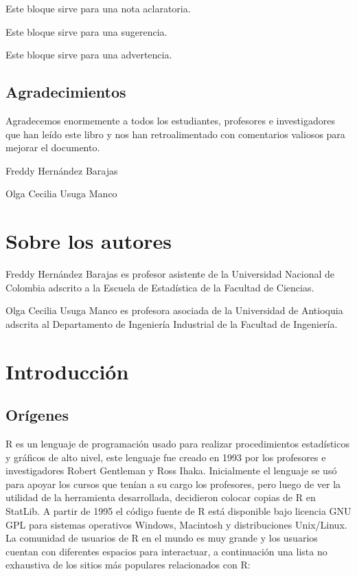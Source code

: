 \documentclass[10pt,]{krantz}
\let\proglang=\textsf
\let\BeginKnitrBlock\begin \let\EndKnitrBlock\end
\begin{document}
\BeginKnitrBlock{rmdnote}
Este bloque sirve para una nota aclaratoria.
\EndKnitrBlock{rmdnote}

\BeginKnitrBlock{rmdtip}
Este bloque sirve para una sugerencia.
\EndKnitrBlock{rmdtip}

\BeginKnitrBlock{rmdwarning}
Este bloque sirve para una advertencia.
\EndKnitrBlock{rmdwarning}

\section*{Agradecimientos}\label{agradecimientos}


Agradecemos enormemente a todos los estudiantes, profesores e
investigadores que han leído este libro y nos han retroalimentado con
comentarios valiosos para mejorar el documento.

\BeginKnitrBlock{flushright}
Freddy Hernández Barajas

Olga Cecilia Usuga Manco
\EndKnitrBlock{flushright}

\chapter*{Sobre los autores}\label{sobre-los-autores}


Freddy Hernández Barajas es profesor asistente de la Universidad
Nacional de Colombia adscrito a la Escuela de Estadística de la Facultad
de Ciencias.

Olga Cecilia Usuga Manco es profesora asociada de la Universidad de
Antioquia adscrita al Departamento de Ingeniería Industrial de la
Facultad de Ingeniería.

\mainmatter

\chapter{Introducción}\label{introduccion}

\section{Orígenes} \label{sec:origenes}

\proglang{R} es un lenguaje de programación usado para realizar
procedimientos estadísticos y gráficos de alto nivel, este lenguaje fue
creado en 1993 por los profesores e investigadores Robert Gentleman y
Ross Ihaka. Inicialmente el lenguaje se usó para apoyar los cursos que
tenían a su cargo los profesores, pero luego de ver la utilidad de la
herramienta desarrollada, decidieron colocar copias de \proglang{R} en
StatLib. A partir de 1995 el código fuente de \proglang{R} está
disponible bajo licencia GNU GPL para sistemas operativos Windows,
Macintosh y distribuciones Unix/Linux. La comunidad de usuarios de
\proglang{R} en el mundo es muy grande y los usuarios cuentan con
diferentes espacios para interactuar, a continuación una lista no
exhaustiva de los sitios más populares relacionados con \proglang{R}:
\end{document}
